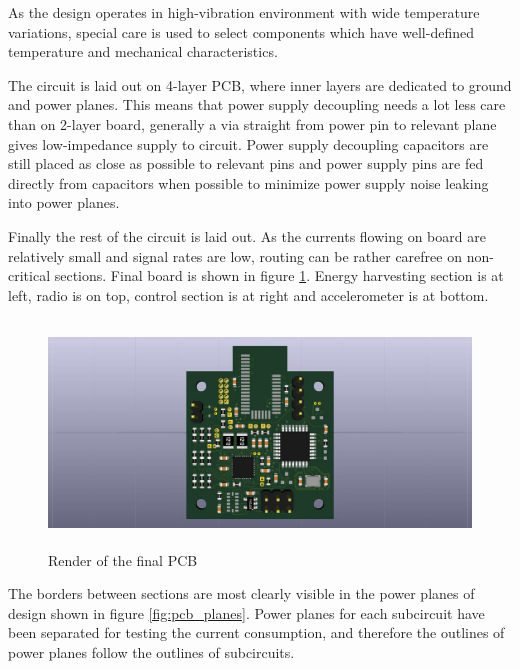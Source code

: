 As the design operates in high-vibration environment with wide temperature variations, special care is used to select components which have well-defined temperature and mechanical characteristics.

The circuit is laid out on 4-layer PCB, where inner layers are dedicated to ground and power planes. This means that power supply decoupling needs a lot less care than on 2-layer board, generally a via straight from power pin to relevant plane gives low-impedance supply to circuit. Power supply decoupling capacitors are still placed as close as possible to relevant pins and power supply pins are fed directly from capacitors when possible to minimize power supply noise leaking into power planes.

Finally the rest of the circuit is laid out. As the currents flowing on board are relatively small and signal rates are low, routing can be rather carefree on non-critical sections. Final board is shown in figure \ref{fig:pcb_render}. Energy harvesting section is at left, radio is on top, control section is at right and accelerometer is at bottom. 

\begin{figure}[htb]
  \begin{center}
    \includegraphics[height=6cm]{images/own_dwg/circuit/render.jpg}
  \end{center}
  \caption{\label{fig:pcb_render} Render of the final PCB}
\end{figure}

The borders between sections are most clearly visible in the power planes of design shown in figure \ref{fig:pcb_planes}. Power planes for each subcircuit have been separated for testing the current consumption, and therefore the outlines of power planes follow the outlines of subcircuits.

